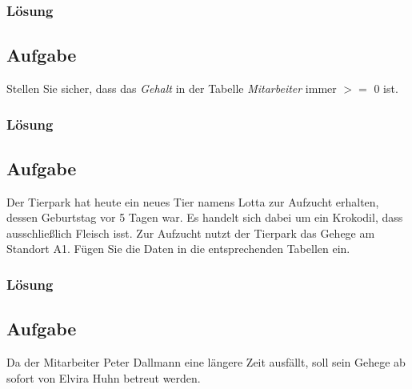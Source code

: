 \subsubsection*{Lösung}
\label{subsubsec:uebung_01.aufgabe_03.loesung}


\subsection{Aufgabe}
\label{subsec:uebung_01.aufgabe_04}
Stellen Sie sicher, dass das \textit{Gehalt} in der Tabelle \textit{Mitarbeiter} immer $>=$ 0 ist.

\subsubsection*{Lösung}
\label{subsubsec:uebung_01.aufgabe_04.loesung}


\subsection{Aufgabe}
\label{subsec:uebung_01.aufgabe_05}
Der Tierpark hat heute ein neues Tier namens Lotta zur Aufzucht erhalten, dessen Geburtstag vor 5 Tagen war. Es handelt sich dabei um ein Krokodil, dass ausschließlich Fleisch isst. Zur Aufzucht nutzt der Tierpark das Gehege am Standort A1. Fügen Sie die Daten in die entsprechenden Tabellen ein.

\subsubsection*{Lösung}
\label{subsubsec:uebung_01.aufgabe_5.loesung}


\subsection{Aufgabe}
\label{subsec:uebung_01.aufgabe_06}
Da der Mitarbeiter Peter Dallmann eine längere Zeit ausfällt, soll sein Gehege ab sofort von Elvira Huhn betreut werden.

